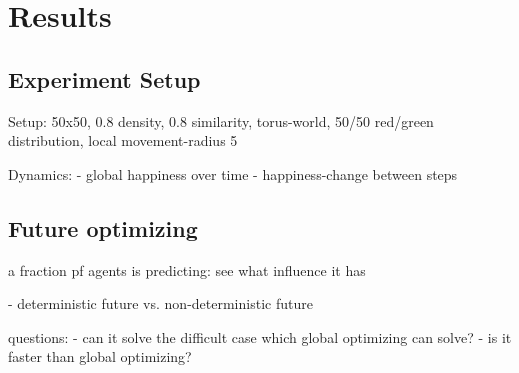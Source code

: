 \section{Results}

\subsection{Experiment Setup}

Setup: 
50x50, 0.8 density, 0.8 similarity, torus-world, 50/50 red/green distribution, local movement-radius 5

Dynamics:
- global happiness over time
- happiness-change between steps


\subsection{Future optimizing}
a fraction pf agents is predicting: see what influence it has

- deterministic future vs. non-deterministic future

questions:
	- can it solve the difficult case which global optimizing can solve?
	- is it faster than global optimizing?